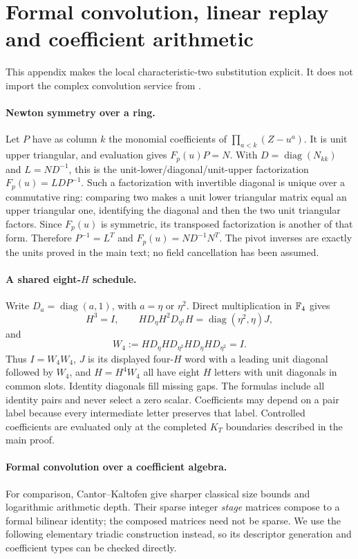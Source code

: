 \section{Formal convolution, linear replay and coefficient arithmetic}
\label{app:local-words}

This appendix makes the local characteristic-two substitution explicit.
It does not import the complex convolution service from \cite{local}.

\paragraph{Newton symmetry over a ring.}
Let $P$ have as column $k$ the monomial coefficients of
$\prod_{a<k}(Z-u^a)$. It is unit upper triangular, and evaluation
gives $F_p(u)P=N$. With $D=\operatorname{diag}(N_{kk})$ and
$L=ND^{-1}$, this is the unit-lower/diagonal/unit-upper factorization
$F_p(u)=LDP^{-1}$. Such a factorization with invertible diagonal is
unique over a commutative ring: comparing two makes a unit lower
triangular matrix equal an upper triangular one, identifying the
diagonal and then the two unit triangular factors. Since $F_p(u)$ is
symmetric, its transposed factorization is another of that form.
Therefore $P^{-1}=L^T$ and $F_p(u)=ND^{-1}N^T$. The pivot inverses
are exactly the units proved in the main text; no field cancellation
has been assumed.

\paragraph{A shared eight-$H$ schedule.}
Write $D_a=\operatorname{diag}(a,1)$, with $a=\eta$ or $\eta^2$.
Direct multiplication in $\mathbb F_4$ gives
\[
 H^3=I,\qquad
 H D_\eta H^2 D_{\eta^2}H
   =\operatorname{diag}(\eta^2,\eta)J,
\]
and
\[
 W_4:=H D_\eta H D_{\eta^2}H D_\eta H D_{\eta^2}=I.
\]
Thus $I=W_4W_4$, $J$ is its displayed four-$H$ word with a leading
unit diagonal followed by $W_4$, and $H=H^4W_4$ all have eight $H$
letters with unit diagonals in common slots. Identity diagonals fill
missing gaps. The formulas include all identity pairs and never
select a zero scalar. Coefficients may depend on a pair label because
every intermediate letter preserves that label. Controlled
coefficients are evaluated only at the completed $K_T$ boundaries
described in the main proof.

\paragraph{Formal convolution over a coefficient algebra.}
For comparison, Cantor--Kaltofen \cite{cantor-kaltofen} give sharper
classical size bounds and logarithmic arithmetic depth. Their sparse
integer \emph{stage} matrices compose to a formal bilinear identity;
the composed matrices need not be sparse. We use the following
elementary triadic construction instead, so its descriptor generation
and coefficient types can be checked directly.

